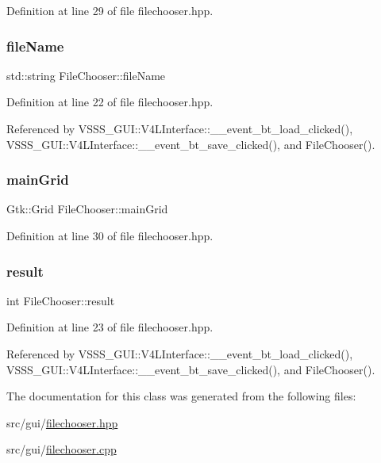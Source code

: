 Definition at line 29 of file filechooser.\+hpp.

\mbox{\label{class_file_chooser_a1d086cbbd2700e5fe9e143c505b205c8}} 
\subsubsection{\texorpdfstring{file\+Name}{fileName}}
{\footnotesize\ttfamily std\+::string File\+Chooser\+::file\+Name}



Definition at line 22 of file filechooser.\+hpp.



Referenced by V\+S\+S\+S\+\_\+\+G\+U\+I\+::\+V4\+L\+Interface\+::\+\_\+\+\_\+event\+\_\+bt\+\_\+load\+\_\+clicked(), V\+S\+S\+S\+\_\+\+G\+U\+I\+::\+V4\+L\+Interface\+::\+\_\+\+\_\+event\+\_\+bt\+\_\+save\+\_\+clicked(), and File\+Chooser().

\mbox{\label{class_file_chooser_ad4533e29ed9c3dc3bd3d48c513688abb}} 
\subsubsection{\texorpdfstring{main\+Grid}{mainGrid}}
{\footnotesize\ttfamily Gtk\+::\+Grid File\+Chooser\+::main\+Grid\hspace{0.3cm}{\ttfamily [protected]}}



Definition at line 30 of file filechooser.\+hpp.

\mbox{\label{class_file_chooser_a7651bd1362ed109c0ac323d8ab41b254}} 
\subsubsection{\texorpdfstring{result}{result}}
{\footnotesize\ttfamily int File\+Chooser\+::result}



Definition at line 23 of file filechooser.\+hpp.



Referenced by V\+S\+S\+S\+\_\+\+G\+U\+I\+::\+V4\+L\+Interface\+::\+\_\+\+\_\+event\+\_\+bt\+\_\+load\+\_\+clicked(), V\+S\+S\+S\+\_\+\+G\+U\+I\+::\+V4\+L\+Interface\+::\+\_\+\+\_\+event\+\_\+bt\+\_\+save\+\_\+clicked(), and File\+Chooser().



The documentation for this class was generated from the following files\+:\begin{DoxyCompactItemize}
\item 
src/gui/\hyperlink{filechooser_8hpp}{filechooser.\+hpp}\item 
src/gui/\hyperlink{filechooser_8cpp}{filechooser.\+cpp}\end{DoxyCompactItemize}
